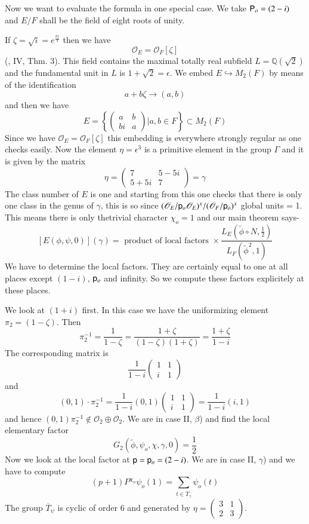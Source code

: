 Now we want to evaluate the formula in one special case. We take $\mathsf{P}_{o}=(2-i)$ and $E/F$ shall be the field of eight roots of unity.

If $\zeta=\sqrt{i}=e^{\frac{\pi i}{4}}$ then we have
$$
\mathscr{O}_{E}=\mathscr{O}_{F}[\zeta]
$$
(\cite{art2-key12}, IV, Thm. 3). This field contains the maximal totally real subfield $L=\mathbb{Q}(\sqrt{2})$ and the fundamental unit in $L$ is $1+\sqrt{2}=\epsilon$. We embed $E\hookrightarrow M_{2}(F)$ by means of the identification
$$
a+b\zeta\to (a,b)
$$
and then we have
$$
E=\left\{\left(\begin{matrix} a & b\\ bi & a\end{matrix}\right)\Big| a,b\in F\right\}\subset M_{2}(F)
$$
Since we have $\mathscr{O}_{E}=\mathscr{O}_{F}[\zeta]$ this embedding is everywhere strongly regular as one checks easily. Now the element $\eta=\epsilon^{3}$ is a primitive element in the group $\Gamma$ and it is given by the matrix
$$
\eta=\left(\begin{matrix} 7 & 5-5i\\ 5+5i & 7\end{matrix}\right)=\gamma
$$
The class number of $E$ is one and starting from this one checks that there is only one class in the genus of $\gamma$, this is so since $(\mathscr{O}_{E}/\mathsf{p}_{o}\mathscr{O}_{E})^{x}/(\mathscr{O}_{F}/\mathsf{p}_{o})^{x}$ global units = 1. This means there is only the\pageoriginale trivial character $\chi_{o}=1$ and our main theorem says-
$$
[E(\phi,\psi,0)](\gamma)=\text{~product of local factors }\times \frac{L_{E}\left(\widetilde{\phi}\circ N,\frac{1}{2}\right)}{L_{F}(\widetilde{\phi}^{2},1)}
$$
We have to determine the local factors. They are certainly equal to one at all places except $(1-i)$, $\mathsf{p}_{o}$ and infinity. So we compute these factors explicitely at these places.

We look at $(1+i)$ first. In this case we have the uniformizing element $\pi_{2}=(1-\zeta)$. Then
$$
\pi^{-1}_{2}=\frac{1}{1-\zeta}=\frac{1+\zeta}{(1-\zeta)(1+\zeta)}=\frac{1+\zeta}{1-i}
$$
The corresponding matrix is
$$
\frac{1}{1-i}\left(\begin{matrix} 1 & 1\\ i & 1\end{matrix}\right)
$$
and
$$
(0,1)\cdot \pi^{-1}_{2}=\frac{1}{1-i}(0,1)\left(\begin{matrix} 1 & 1\\ i & 1\end{matrix}\right)=\frac{1}{1-i}(i,1)
$$
and hence $(0,1)\pi^{-1}_{2}\not\in \mathscr{O}_{2}\oplus \mathscr{O}_{2}$. We are in case II, $\beta$) and find the local elementary factor
$$
G_{2}(\widetilde{\phi},\psi_{o},\chi,\gamma,0)=\frac{1}{2}
$$
Now we look at the local factor at $\mathsf{p}=\mathsf{p}_{o}=(2-i)$. We are in case II, $\gamma$) and we have to compute
$$
(p+1)P^{\chi_{o}}\psi_{o}(1)=\sum\limits_{t\in \overline{T}_{\gamma}}\psi_{o}(t)
$$
The group $\overline{T}_{\psi}$ is cyclic of order 6 and generated by $\eta=\left(\begin{smallmatrix} 3 & 1\\ 2 & 3\end{smallmatrix}\right)$.

